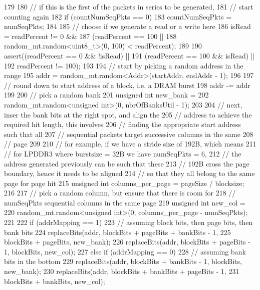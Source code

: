 \begin{DoxyCode}
179 {
180     // if this is the first of the packets in series to be generated,
181     // start counting again
182     if (countNumSeqPkts == 0) {
183         countNumSeqPkts = numSeqPkts;
184 
185         // choose if we generate a read or a write here
186         isRead = readPercent != 0 &&
187             (readPercent == 100 ||
188              random_mt.random<uint8_t>(0, 100) < readPercent);
189 
190         assert((readPercent == 0 && !isRead) ||
191                (readPercent == 100 && isRead) ||
192                readPercent != 100);
193 
194         // start by picking a random address in the range
195         addr = random_mt.random<Addr>(startAddr, endAddr - 1);
196 
197         // round down to start address of a block, i.e. a DRAM burst
198         addr -= addr %
199 
200         // pick a random bank
201         unsigned int new_bank =
202             random_mt.random<unsigned int>(0, nbrOfBanksUtil - 1);
203 
204         // next, inser the bank bits at the right spot, and align the
205         // address to achieve the required hit length, this involves
206         // finding the appropriate start address such that all
207         // sequential packets target successive columns in the same
208         // page
209 
210         // for example, if we have a stride size of 192B, which means
211         // for LPDDR3 where burstsize = 32B we have numSeqPkts = 6,
212         // the address generated previously can be such that these
213         // 192B cross the page boundary, hence it needs to be aligned
214         // so that they all belong to the same page for page hit
215         unsigned int columns_per_page = pageSize / blocksize;
216 
217         // pick a random column, but ensure that there is room for
218         // numSeqPkts sequential columns in the same page
219         unsigned int new_col =
220             random_mt.random<unsigned int>(0, columns_per_page - numSeqPkts);
221 
222         if (addrMapping == 1) {
223             // assuming block bits, then page bits, then bank bits
224             replaceBits(addr, blockBits + pageBits + bankBits - 1,
225                         blockBits + pageBits, new_bank);
226             replaceBits(addr, blockBits + pageBits - 1, blockBits, new_col);
227         } else if (addrMapping == 0) {
228             // assuming bank bits in the bottom
229             replaceBits(addr, blockBits + bankBits - 1, blockBits, new_bank);
230             replaceBits(addr, blockBits + bankBits + pageBits - 1,
231                         blockBits + bankBits, new_col);
}}}
\end{DoxyCode}
